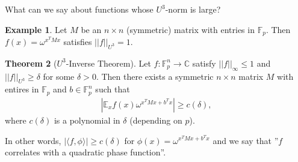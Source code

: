 \documentclass{article}
\theoremstyle{definition}
\newtheorem{theorem}{Theorem}[section]
\newtheorem{example}[theorem]{Example}
\begin{document}
What can we say about functions whose $U^3$-norm is large?
\begin{example}\label{example4.13}
    Let $M$ be an $n\times n$ (symmetric) matrix with entries in $\mathbb{F}_p$. Then $f(x)= \omega^{x^T M x}$ satisfies $||f||_{U^3}=1$.
\end{example}
\begin{theorem}[$U^3$-Inverse Theorem]\label{theorem4.15}
    Let $f : \mathbb{F}_p^n \to \mathbb{C}$ satisfy $||f||_{\infty}\le 1$ and $||f||_{U^3}\ge \delta$ for some $\delta>0$. Then there exists a symmetric $n \times n$ matrix $M$ with entires in $\mathbb{F}_p$ and $b \in \mathbb{F}_p^n$ such that
    \begin{align*}
        \left|\mathbb{E}_x f(x)\omega^{x^T M x + b^T x}\right| \ge c(\delta),
    \end{align*}
    where $c(\delta)$ is a polynomial in $\delta$ (depending on $p$).
\end{theorem}
In other words, $\left| \langle f, \phi \rangle\right|\ge c(\delta)$ for $\phi(x)=\omega^{x^T M x + b^T x}$ and we say that ''$f$ correlates with a quadratic phase function''.
\end{document}
